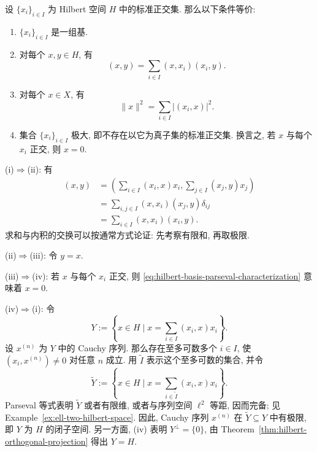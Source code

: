 \begin{Theorem}
\label{thm:hilbert-basis-equivalent-characterizations}
设 $\{x_i\}_{i\in I}$ 为 Hilbert 空间 $H$ 中的标准正交集. 那么以下条件等价:\begin{enumerate}[label=(\roman*)]
\item $\{x_i\}_{i\in I}$ 是一组基.
\item 对每个 $x,y\in H$, 有
\begin{equation}\label{eq:hilbert-basis-inner-product-expansion}
(x,y)=\sum_{i\in I}(x,x_i)(x_i,y).
\end{equation}

\item 对每个 $x\in X$, 有
\begin{equation}\label{eq:hilbert-basis-parseval-characterization}
\|x\|^2=\sum_{i\in I}|(x_i,x)|^2.
\end{equation}

\item 集合 $\{x_i\}_{i\in I}$ 极大, 即不存在以它为真子集的标准正交集. 换言之, 若 $x$ 与每个 $x_i$ 正交, 则 $x=0$.\end{enumerate}
\end{Theorem}

\begin{Proof}
(i)$\Rightarrow$(ii): 有
\begin{equation}\label{eq:hilbert-basis-double-sum-inner-product}
\begin{aligned}
(x,y)&=\left(\sum_{i\in I}(x_i,x)x_i,\sum_{j\in I}(x_j,y)x_j\right)\\
&=\sum_{i,j\in I}(x,x_i)(x_j,y)\delta_{ij}\\
&=\sum_{i\in I}(x,x_i)(x_i,y).
\end{aligned}
\end{equation}
求和与内积的交换可以按通常方式论证: 先考察有限和, 再取极限.

(ii)$\Rightarrow$(iii): 令 $y=x$.

(iii)$\Rightarrow$(iv): 若 $x$ 与每个 $x_i$ 正交, 则 \eqref{eq:hilbert-basis-parseval-characterization} 意味着 $x=0$.

(iv)$\Rightarrow$(i): 令
\begin{equation}\label{eq:orthonormal-family-expansion-subspace}
Y:=\left\{x\in H\mid x=\sum_{i\in I}(x_i,x)x_i\right\}.
\end{equation}
设 $x^{(n)}$ 为 $Y$ 中的 Cauchy 序列. 那么存在至多可数多个 $i\in I$, 使 $(x_i,x^{(n)})\ne0$ 对任意 $n$ 成立. 用 $\widetilde I$ 表示这个至多可数的集合, 并令
\begin{equation}\label{eq:countable-orthonormal-expansion-subspace}
\widetilde Y:=\left\{x\in H\mid x=\sum_{i\in\widetilde I}(x_i,x)x_i\right\}.
\end{equation}
Parseval 等式表明 $\widetilde Y$ 或者有限维, 或者与序列空间 $\ell^2$ 等距, 因而完备; 见 Example~\ref{ex:ell-two-hilbert-space}. 因此, Cauchy 序列 $x^{(n)}$ 在 $\widetilde Y\subseteq Y$ 中有极限, 即 $Y$ 为 $H$ 的闭子空间. 另一方面, (iv) 表明 $Y^\perp=\{0\}$, 由 Theorem~\ref{thm:hilbert-orthogonal-projection} 得出 $Y=H$.
\end{Proof}

